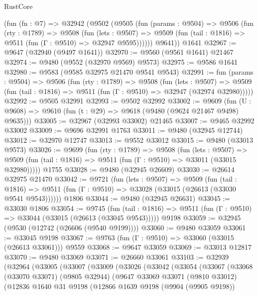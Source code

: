 \begin{lexlean}{RustCore}
\begin{coremodule}
    (fun (fn : @7) =>
    @32942
      (@9502
        (@9505
          (fun (params : @9504) =>
          @9506
            (fun (rty : @1789) =>
            @9508
              (fun (lets : @9507) =>
              @9509 (fun (tail : @1816) => @9511 (fun (Γ : @9510) => @32947 @9595))))))
        @9641))
    @1641
@32967 := @9647 (@32940 (@9497 @1641))
@32970 := @9560 (@9561 @1641) @21467
@32974 := @9480 (@9552 (@32970 @9569) @9573)
@32975 := @9586 @1641
@32980 := @9583 (@9585 @32975 @21470 @9541 @9543)
@32991 := fun (params : @9504) =>
  @9506
    (fun (rty : @1789) =>
    @9508
      (fun (lets : @9507) =>
      @9509 (fun (tail : @1816) => @9511 (fun (Γ : @9510) => @32947 (@32974 @32980)))))
@32992 := @9505 @32991
@32993 := @9502 @32992
@33002 := @9609
    (fun (U : @9608) => @9610 (fun (t : @29) => @9618 (@9480 (@9624 @21467 @9498) @9635)))
@33005 := @32967 (@32993 @33002) @21465
@33007 := @9465 @32992 @33002
@33009 := @9696 @32991 @1763
@33011 := @9480 (@32945 @12744)
@33012 := @32970 @12747
@33013 := @9552 @33012
@33015 := @9480 (@33013 @9573)
@33026 := @9699
    (fun (rty : @1789) =>
    @9508
      (fun (lets : @9507) =>
      @9509 (fun (tail : @1816) => @9511 (fun (Γ : @9510) => @33011 (@33015 @32980)))))
    @1755
@33028 := @9480 (@32945 @26609)
@33030 := @26614 @32975 @21470
@33042 := @9721
    (fun (lets : @9507) =>
    @9509
      (fun (tail : @1816) =>
      @9511 (fun (Γ : @9510) => @33028 (@33015 (@26613 (@33030 @9541 @9543))))))
    @1806
@33044 := @9480 (@32945 @26631)
@33045 := @33030 @1806
@33054 := @9745
    (fun (tail : @1816) => @9511 (fun (Γ : @9510) => @33044 (@33015 (@26613 (@33045 @9543)))))
    @9198
@33059 := @32945 (@9530 (@12742 (@26606 (@9540 @9199))))
@33060 := @9480 @33059
@33061 := @33045 @9198
@33067 := @9763 (fun (Γ : @9510) => @33060 (@33015 (@26613 @33061))) @9559
@33068 := @9647 @33059
@33069 := @33013 @12817
@33070 := @9480 @33069
@33071 := @26660 @33061
@33103 := @32939
    (@32964
      (@33005
        (@33007
          (@33009
            (@33026
              (@33042
                (@33054
                  (@33067
                    (@33068
                      (@33070 @33071)
                      (@9805 @32944)
                      (@9647
                        @33069
                        @33071
                        (@9810 @33012)
                        (@12836
                          @1640
                          @31
                          @9198
                          (@12866
                            @1639
                            @9198
                            (@9904 (@9905 @9198))

\end{coremodule}
\end{lexlean}
